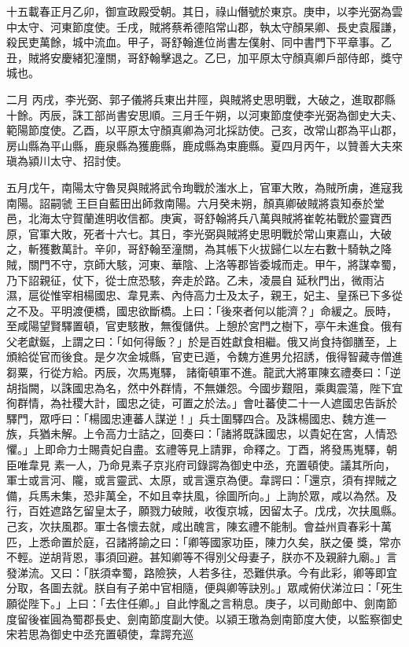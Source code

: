 \begin{pinyinscope}
 十五載春正月乙卯，御宣政殿受朝。其日，祿山僭號於東京。庚申，以李光弼為雲中太守、河東節度使。壬戌，賊將蔡希德陷常山郡，執太守顏杲卿、長史袁履謙，殺民吏萬餘，城中流血。甲子，哥舒翰進位尚書左僕射、同中書門下平章事。乙丑，賊將安慶緒犯潼關，哥舒翰擊退之。乙巳，加平原太守顏真卿戶部侍郎，獎守城也。



 二月
 丙戌，李光弼、郭子儀將兵東出井陘，與賊將史思明戰，大破之，進取郡縣十餘。丙辰，誅工部尚書安思順。三月壬午朔，以河東節度使李光弼為御史大夫、範陽節度使。乙酉，以平原太守顏真卿為河北採訪使。己亥，改常山郡為平山郡，房山縣為平山縣，鹿泉縣為獲鹿縣，鹿成縣為束鹿縣。夏四月丙午，以贊善大夫來瑱為潁川太守、招討使。



 五月戊午，南陽太守魯炅與賊將武令珣戰於滍水上，官軍大敗，為賊所虜，進寇我南陽。詔嗣虢
 王巨自藍田出師救南陽。六月癸未朔，顏真卿破賊將袁知泰於堂邑，北海太守賀蘭進明收信都。庚寅，哥舒翰將兵八萬與賊將崔乾祐戰於靈寶西原，官軍大敗，死者十六七。其日，李光弼與賊將史思明戰於常山東嘉山，大破之，斬獲數萬計。辛卯，哥舒翰至潼關，為其帳下火拔歸仁以左右數十騎執之降賊，關門不守，京師大駭，河東、華陰、上洛等郡皆委城而走。甲午，將謀幸蜀，乃下詔親征，仗下，從士庶恐駭，奔走於路。乙未，凌晨自
 延秋門出，微雨沾濕，扈從惟宰相楊國忠、韋見素、內侍高力士及太子，親王，妃主、皇孫已下多從之不及。平明渡便橋，國忠欲斷橋。上曰：「後來者何以能濟？」命緩之。辰時，至咸陽望賢驛置頓，官吏駭散，無復儲供。上憩於宮門之樹下，亭午未進食。俄有父老獻鋋，上謂之曰：「如何得飯？」於是百姓獻食相繼。俄又尚食持御膳至，上頒給從官而後食。是夕次金城縣，官吏已遁，令魏方進男允招誘，俄得智藏寺僧進芻粟，行從方給。丙辰，次馬嵬驛，
 諸衛頓軍不進。龍武大將軍陳玄禮奏曰：「逆胡指闕，以誅國忠為名，然中外群情，不無嫌怨。今國步艱阻，乘輿震蕩，陛下宜徇群情，為社稷大計，國忠之徒，可置之於法。」會吐蕃使二十一人遮國忠告訴於驛門，眾呼曰：「楊國忠連蕃人謀逆！」兵士圍驛四合。及誅楊國忠、魏方進一族，兵猶未解。上令高力士詰之，回奏曰：「諸將既誅國忠，以貴妃在宮，人情恐懼。」上即命力士賜貴妃自盡。玄禮等見上請罪，命釋之。丁酉，將發馬嵬驛，朝臣唯韋見
 素一人，乃命見素子京兆府司錄諤為御史中丞，充置頓使。議其所向，軍士或言河、隴，或言靈武、太原，或言還京為便。韋諤曰：「還京，須有捍賊之備，兵馬未集，恐非萬全，不如且幸扶風，徐圖所向。」上詢於眾，咸以為然。及行，百姓遮路乞留皇太子，願戮力破賊，收復京城，因留太子。戊戌，次扶風縣。己亥，次扶風郡。軍士各懷去就，咸出醜言，陳玄禮不能制。會益州貢春彩十萬匹，上悉命置於庭，召諸將諭之曰：「卿等國家功臣，陳力久矣，朕之優
 獎，常亦不輕。逆胡背恩，事須回避。甚知卿等不得別父母妻子，朕亦不及親辭九廟。」言發涕流。又曰：「朕須幸蜀，路險狹，人若多往，恐難供承。今有此彩，卿等即宜分取，各圖去就。朕自有子弟中官相隨，便與卿等訣別。」眾咸俯伏涕泣曰：「死生願從陛下。」上曰：「去住任卿。」自此悖亂之言稍息。庚子，以司勛郎中、劍南節度留後崔圓為蜀郡長史、劍南節度副大使。以潁王璬為劍南節度大使，以監察御史宋若思為御史中丞充置頓使，韋諤充巡

\end{pinyinscope}
